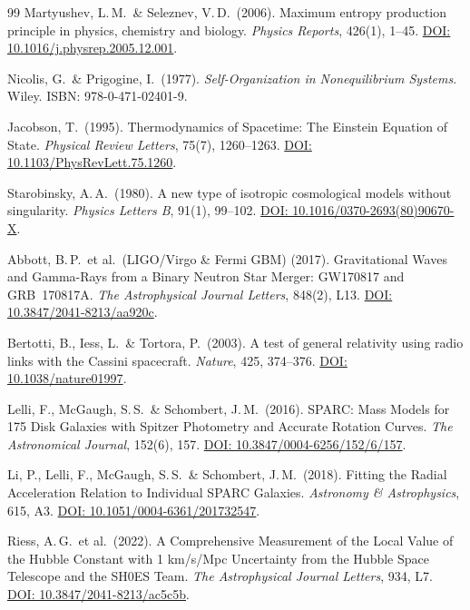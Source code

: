 \documentclass[aps,prd,twocolumn,superscriptaddress,nofootinbib]{revtex4-2}
\begin{document}
\begin{thebibliography}{99}
Martyushev, L.\,M.\ \& Seleznev, V.\,D.\ (2006).
Maximum entropy production principle in physics, chemistry and biology.
\textit{Physics Reports}, 426(1), 1--45.
\href{https://doi.org/10.1016/j.physrep.2005.12.001}{DOI: 10.1016/j.physrep.2005.12.001}.

Nicolis, G.\ \& Prigogine, I.\ (1977).
\textit{Self-Organization in Nonequilibrium Systems}. Wiley. ISBN: 978-0-471-02401-9.

Jacobson, T.\ (1995).
Thermodynamics of Spacetime: The Einstein Equation of State.
\textit{Physical Review Letters}, 75(7), 1260--1263.
\href{https://doi.org/10.1103/PhysRevLett.75.1260}{DOI: 10.1103/PhysRevLett.75.1260}.

Starobinsky, A.\,A.\ (1980).
A new type of isotropic cosmological models without singularity.
\textit{Physics Letters B}, 91(1), 99--102.
\href{https://doi.org/10.1016/0370-2693(80)90670-X}{DOI: 10.1016/0370-2693(80)90670-X}.

Abbott, B.\,P.\ et al.\ (LIGO/Virgo \& Fermi GBM) (2017).
Gravitational Waves and Gamma-Rays from a Binary Neutron Star Merger: GW170817 and GRB~170817A.
\textit{The Astrophysical Journal Letters}, 848(2), L13.
\href{https://doi.org/10.3847/2041-8213/aa920c}{DOI: 10.3847/2041-8213/aa920c}.

Bertotti, B., Iess, L.\ \& Tortora, P.\ (2003).
A test of general relativity using radio links with the Cassini spacecraft.
\textit{Nature}, 425, 374--376.
\href{https://doi.org/10.1038/nature01997}{DOI: 10.1038/nature01997}.

Lelli, F., McGaugh, S.\,S.\ \& Schombert, J.\,M.\ (2016).
SPARC: Mass Models for 175 Disk Galaxies with Spitzer Photometry and Accurate Rotation Curves.
\textit{The Astronomical Journal}, 152(6), 157.
\href{https://doi.org/10.3847/0004-6256/152/6/157}{DOI: 10.3847/0004-6256/152/6/157}.

Li, P., Lelli, F., McGaugh, S.\,S.\ \& Schombert, J.\,M.\ (2018).
Fitting the Radial Acceleration Relation to Individual SPARC Galaxies.
\textit{Astronomy \& Astrophysics}, 615, A3.
\href{https://doi.org/10.1051/0004-6361/201732547}{DOI: 10.1051/0004-6361/201732547}.

Riess, A.\,G.\ et al.\ (2022).
A Comprehensive Measurement of the Local Value of the Hubble Constant with 1 km/s/Mpc Uncertainty from the Hubble Space Telescope and the SH0ES Team.
\textit{The Astrophysical Journal Letters}, 934, L7.
\href{https://doi.org/10.3847/2041-8213/ac5c5b}{DOI: 10.3847/2041-8213/ac5c5b}.


\end{thebibliography}
\end{document}
